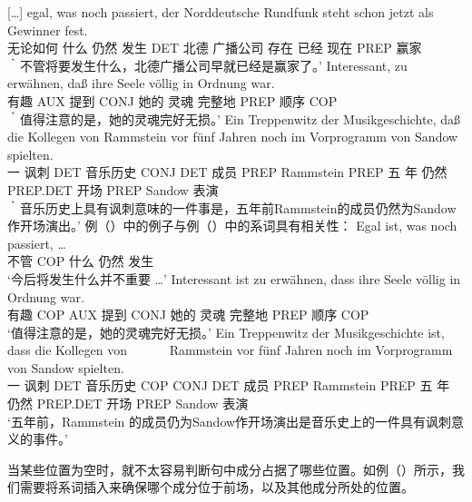 {}[\ldots]
\gll egal,      was  noch  passiert, der Norddeutsche Rundfunk             steht  schon   jetzt als Gewinner fest.\footnotemark\\
     无论如何 什么 仍然 发生 DET 北德 广播公司 存在 已经 现在 PREP 赢家 \particle\\
\glt ｀不管将要发生什么，北德广播公司早就已经是赢家了。'
\ex 
\gll Interessant, zu erwähnen, daß ihre Seele völlig    in Ordnung war.\footnotemark\\
	 有趣 AUX 提到 CONJ 她的 灵魂 完整地 PREP 顺序 COP\\
\glt ｀值得注意的是，她的灵魂完好无损。'
\ex
\gll Ein Treppenwitz der    Musikgeschichte, daß die Kollegen   von Rammstein vor    fünf Jahren noch im      Vorprogramm   von Sandow spielten.\footnotemark\\
	 一 讽刺 DET 音乐历史 CONJ DET 成员 PREP Rammstein PREP 五 年 仍然 PREP.DET 开场 PREP Sandow 表演\\
\glt ｀音乐历史上具有讽刺意味的一件事是，五年前Rammstein的成员仍然为Sandow作开场演出。'
\zl
例（）中的例子与例（）中的系词具有相关性：
\eal
\ex 
\gll Egal ist, was noch passiert, \ldots\\
     不管 COP	 什么 仍然 发生 \\
\glt `今后将发生什么并不重要 \ldots'
\ex
\gll Interessant ist zu erwähnen, dass ihre Seele völlig in Ordnung war.\\
	 有趣 COP AUX 提到 CONJ 她的 灵魂 完整地 PREP 顺序 COP\\
\glt `值得注意的是，她的灵魂完好无损。'
\ex %
\gll Ein Treppenwitz der Musikgeschichte ist, dass die Kollegen von~~~~~~ Rammstein vor fünf Jahren noch im Vorprogramm von Sandow spielten.\hspace{-5pt}\\
	 一 讽刺 DET 音乐历史 COP CONJ DET 成员 PREP Rammstein PREP 五 年 仍然 PREP.DET 开场 PREP Sandow 表演\\
\glt `五年前，Rammstein 的成员仍为Sandow作开场演出是音乐史上的一件具有讽刺意义的事件。'
\zl

当某些位置为空时，就不太容易判断句中成分占据了哪些位置。如例（）所示，我们需要将系词插入来确保哪个成分位于前场，以及其他成分所处的位置。

